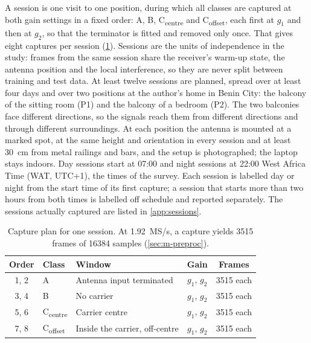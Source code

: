 A session is one visit to one position, during which all classes are captured at both gain settings in a fixed order: A, B, C\textsubscript{centre} and C\textsubscript{offset}, each first at $g_1$ and then at $g_2$, so that the terminator is fitted and removed only once. That gives eight captures per session (\cref{tab:m-session-plan}). Sessions are the units of independence in the study: frames from the same session share the receiver's warm-up state, the antenna position and the local interference, so they are never split between training and test data. At least twelve sessions are planned, spread over at least four days and over two positions at the author's home in Benin City: the balcony of the sitting room (P1) and the balcony of a bedroom (P2). The two balconies face different directions, so the signals reach them from different directions and through different surroundings. At each position the antenna is mounted at a marked spot, at the same height and orientation in every session and at least \qty{30}{\centi\metre} from metal railings and bars, and the setup is photographed; the laptop stays indoors. Day sessions start at 07:00 and night sessions at 22:00 West Africa Time (WAT, UTC+1), the times of the survey. Each session is labelled day or night from the start time of its first capture; a session that starts more than two hours from both times is labelled off schedule and reported separately. The sessions actually captured are listed in \cref{app:sessions}.

\begin{table}[tbp]
  \centering
  \caption[Capture plan for one session]{Capture plan for one session. At \qty{1.92}{MS/s}, a  capture yields \num{3515} frames of \num{16384} samples (\cref{sec:m-preproc}).}
  \label{tab:m-session-plan}
  \begin{tabular}{@{} c l l c c @{}}
    \toprule
    Order & Class & Window & Gain & Frames \\
    \midrule
    1, 2 & A & Antenna input terminated & $g_1$, $g_2$ & \num{3515} each \\
    3, 4 & B & No carrier & $g_1$, $g_2$ & \num{3515} each \\
    5, 6 & C\textsubscript{centre} & Carrier centre & $g_1$, $g_2$ & \num{3515} each \\
    7, 8 & C\textsubscript{offset} & Inside the carrier, off-centre & $g_1$, $g_2$ & \num{3515} each \\
    \bottomrule
  \end{tabular}
\end{table}

